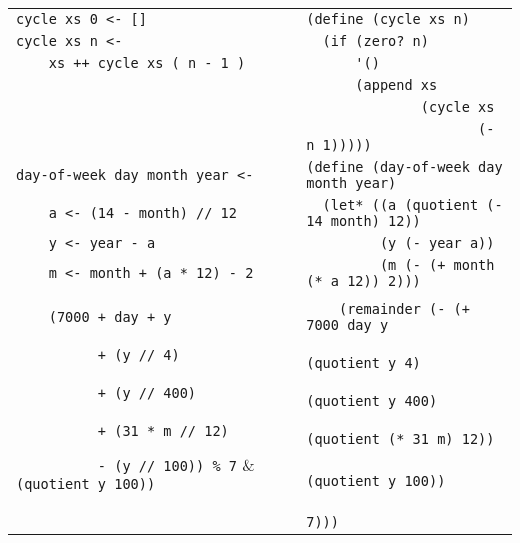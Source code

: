 \begin{table}[ht!]
\begin{tabular}{|l|l|}
            \verb,cycle xs 0 <- [],            & \verb,(define (cycle xs n), \\
            \verb,cycle xs n <- ,              & \verb,  (if (zero? n),\\
            \verb,    xs ++ cycle xs ( n - 1 ),& \verb,      '(), \\
                                               & \verb,      (append xs, \\
                                               & \verb,              (cycle xs, \\
                                               & \verb,                     (- n 1))))), \\ \hline
            
            \verb,day-of-week day month year <-,& \verb,(define (day-of-week day month year), \\
            \verb,    a <- (14 - month) // 12,  & \verb,  (let* ((a (quotient (- 14 month) 12)),\\
            \verb,    y <- year - a,            & \verb,         (y (- year a)), \\
            \verb,    m <- month + (a * 12) - 2,& \verb,         (m (- (+ month (* a 12)) 2))), \\
                                                & \\
            \verb,    (7000 + day + y,          & \verb,    (remainder (- (+ 7000 day y, \\
            \verb,          + (y // 4),         & \verb,                     (quotient y 4), \\
            \verb,          + (y // 400),       & \verb,                     (quotient y 400),\\
            \verb,          + (31 * m // 12),   & \verb,                     (quotient (* 31 m) 12)),\\
            \verb,          - (y // 100)) % 7,  & \verb,                     (quotient y 100)), \\
                                                & \verb,                     7))), \\ \hline
        \end{tabular}
    \end{table}
